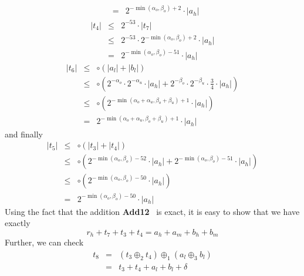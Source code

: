 \documentclass[a4paper,10pt,twoside]{article}
\newenvironment{proof}[1][Proof]{\begin{trivlist}
\item[\hskip \labelsep {\bfseries #1}]}{\end{trivlist}}
\newcommand{\hi}{\ensuremath{\mathit{h}}}
\newcommand{\mi}{\ensuremath{\mathit{m}}}
\newcommand{\lo}{\ensuremath{\mathit{l}}}
\newcommand{\Add}{{\bf Add12}}
\begin{document}
\begin{proof}
\begin{eqnarray*}
& = & 2^{-\min\left(\alpha_o,\beta_o\right) + 2} \cdot \left \vert a_\hi \right \vert
\end{eqnarray*}
\begin{eqnarray*}
\left \vert t_4 \right \vert & \leq & 2^{-53} \cdot \left \vert t_7 \right \vert \\
& \leq & 2^{-53} \cdot 2^{-\min\left(\alpha_o,\beta_o\right)+2} \cdot \left \vert a_\hi \right \vert \\
& = & 2^{-\min\left(\alpha_o,\beta_o\right) -51} \cdot \left \vert a_\hi \right \vert
\end{eqnarray*}
\begin{eqnarray*}
\left \vert t_6 \right \vert & \leq & \circ \left( \left \vert a_\lo \right \vert + \left \vert b_\lo \right \vert \right) \\
& \leq & \circ \left( 2^{-\alpha_o} \cdot 2^{-\alpha_u} \cdot \left \vert a_\hi \right \vert +
                      2^{-\beta_o} \cdot 2^{-\beta_u} \cdot \frac{3}{4} \cdot \left \vert a_\hi \right \vert \right) \\
& \leq & \circ \left( 2^{-\min\left(\alpha_o + \alpha_u,\beta_o + \beta_u\right) + 1} \cdot \left \vert a_\hi \right \vert \right) \\
& = & 2^{-\min\left(\alpha_o + \alpha_u,\beta_o + \beta_u\right) + 1} \cdot \left \vert a_\hi \right \vert
\end{eqnarray*}
and finally
\begin{eqnarray*}
\left \vert t_5 \right \vert & \leq & \circ \left( \left \vert t_3 \right \vert + \left \vert t_4 \right \vert \right) \\
& \leq & \circ \left( 2^{-\min\left(\alpha_o,\beta_o\right) -52} \cdot \left \vert a_\hi \right \vert +
2^{-\min\left(\alpha_o,\beta_o\right)-51} \cdot \left \vert a_\hi \right \vert \right) \\
& \leq & \circ \left( 2^{-\min\left(\alpha_o,\beta_o\right) -50} \cdot \left \vert a_\hi \right \vert \right) \\
& = & 2^{-\min\left(\alpha_o,\beta_o\right)-50} \cdot \left \vert a_\hi \right \vert
\end{eqnarray*}
Using the fact that the addition \Add~ is exact, it is easy to show that we
have exactly
$$r_\hi + t_7 + t_3 + t_4 = a_\hi + a_\mi + b_\hi + b_\mi$$
Further, we can check
\begin{eqnarray*}
t_8 & = & \left( t_3 \oplus_2 t_4 \right) \oplus_1 \left( a_\lo \oplus_3 b_\lo \right) \\
& = & t_3 + t_4 + a_\lo + b_\lo + \delta
\end{eqnarray*}

\end{proof}
\end{document}
